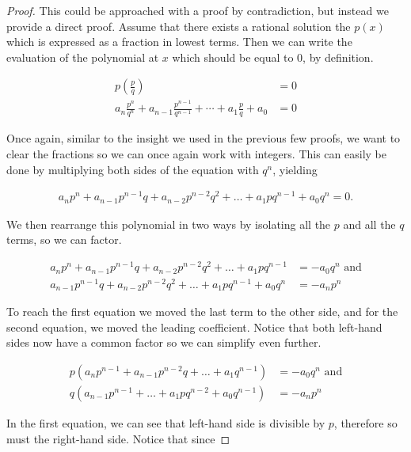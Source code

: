 \documentclass[twoside]{report}
\begin{document}
\begin{proof}
	This could be approached with a proof by contradiction, but instead we provide a direct proof. Assume that there exists a rational solution the $p(x)$ which is expressed as a fraction in lowest terms. Then we can write the evaluation of the polynomial at $x$ which should be equal to 0, by definition.
	
	\begin{align*}
		p\left( \frac{p}{q} \right) &= 0 \\
		a_n \frac{p^n}{q^n} + a_{n - 1} \frac{p^{n - 1}}{q^{n - 1}} + \cdots + a_1 \frac{p}{q} + a_0 &= 0 
	\end{align*}
	
	Once again, similar to the insight we used in the previous few proofs, we want to clear the fractions so we can once again work    with integers. This can easily be done by multiplying both sides of the equation with $q^n$, yielding
	
	\begin{align*}
		a_n p^n + a_{n - 1} p^{n - 1} q + a_{n - 2} p^{n - 2} q^2 + \dots + a_1 p q^{n - 1} + a_0 q^n = 0.
	\end{align*}
	
	We then rearrange this polynomial in two ways by isolating all the $p$ and all the $q$ terms, so we can factor.
	
	\begin{align*}
		a_n p^n + a_{n - 1} p^{n - 1} q + a_{n - 2} p^{n - 2} q^2 + \dots + a_1 p q^{n - 1} &= - a_0 q^n \text{ and} \\
		a_{n - 1} p^{n - 1} q + a_{n - 2} p^{n - 2} q^2 + \dots + a_1 p q^{n - 1} + a_0 q^n &= -a_n p^n
	\end{align*}
	
	To reach the first equation we moved the last term to the other side, and for the second equation, we moved the leading coefficient. Notice that both left-hand sides now have a common factor so we can simplify even further.
	
	\begin{align*}
		p (a_n p^{n - 1} + a_{n - 1} p^{n - 2} q + \dots + a_1 q^{n - 1}) &= - a_0 q^n \text{ and} \\
		q (a_{n - 1} p^{n - 1} + \dots + a_1 p q^{n - 2} + a_0 q^{n - 1}) &= -a_n p^n
	\end{align*}
	
	In the first equation, we can see that left-hand side is divisible by $p$, therefore so must the right-hand side. Notice that since
	

\end{proof}
\end{document}
